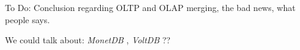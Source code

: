 \documentclass[10pt]{article} %
\begin{document}
To Do: Conclusion regarding OLTP and OLAP merging, the bad news, what people says.

We could talk about: \emph{ MonetDB }, \emph{ VoltDB }??





\end{document}
